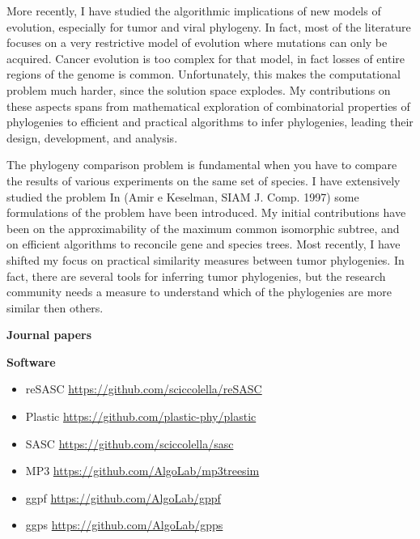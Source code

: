 \documentclass[11pt,a4paper,roman]{moderncv}
\begin{document}
More recently, I have studied the algorithmic implications of new models of
evolution, especially for tumor and viral phylogeny.
In fact, most of the literature focuses on a very restrictive model of evolution
where mutations can only be acquired.
Cancer evolution is too complex for that model, in fact losses of entire regions
of the genome is common.
Unfortunately, this makes the computational problem much harder, since the
solution space explodes.
My contributions on these aspects spans from mathematical exploration of
combinatorial properties of phylogenies to efficient and practical algorithms to
infer phylogenies, leading their design, development, and analysis.


The phylogeny comparison problem is fundamental when you have to compare
the results of various experiments on the same set of species. I have
extensively studied the problem In (Amir e Keselman, SIAM J. Comp. 1997)
some formulations of the problem have been introduced. My initial contributions
have been on the approximability of the maximum common isomorphic
subtree, and on efficient algorithms to reconcile gene and species trees.
Most recently, I have shifted my focus on practical similarity measures between
tumor phylogenies.
In fact, there are several tools for inferring tumor phylogenies, but the
research community needs a measure to understand which of the phylogenies are
more similar then others.


\textbf{Journal papers}

\cite{ciccolella2025b}
\cite{bonizzoni2025}
\cite{a16070333}
\cite{DBLP:journals/jcb/AliCLVP21}
\cite{DBLP:journals/bioinformatics/CiccolellaRGPSB21}
\cite{DBLP:journals/bioinformatics/CiccolellaBDBPV21}
\cite{DBLP:journals/bmcbi/CiccolellaGPVHB20}
\cite{DBLP:journals/tcbb/BonizzoniCVS19}
\cite{DBLP:journals/tcs/BonizzoniCVRT17}
\cite{DBLP:journals/fuin/BonizzoniCVRT17}
\cite{bonizzoniExplainingEvolutionConstrained2014}
\cite{DBLP:journals/tcs/BonizzoniVD05}
\cite{DBLP:journals/bioinformatics/VedovaW02}
\cite{DBLP:journals/ijfcs/BonizzoniVM00}


\textbf{Software}

\begin{itemize}
\item reSASC \url{https://github.com/sciccolella/reSASC}
\item Plastic \url{https://github.com/plastic-phy/plastic}
\item SASC \url{https://github.com/sciccolella/sasc}
\item MP3 \url{https://github.com/AlgoLab/mp3treesim}
\item ggpf \url{https://github.com/AlgoLab/gppf}
\item ggps \url{https://github.com/AlgoLab/gpps}
\end{itemize}
\end{document}
